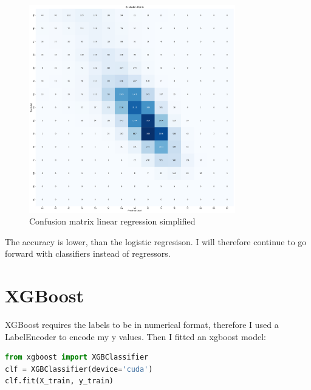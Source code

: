 \documentclass{article}
\begin{document}
\begin{figure}[H]
    \centering    
    \includegraphics[width=0.8\textwidth]{../Models/LinearRegression/confusion_matrix2.pdf}
    \caption{Confusion matrix linear regression simplified}\label{fig:conf_linreg2}
\end{figure}


The accuracy is lower, than the logistic regresison. I will therefore continue to go forward with classifiers instead of regressors.

\section{XGBoost}

XGBoost requires the labels to be in numerical format, therefore I used a LabelEncoder to encode my y values.
Then I fitted an xgboost model:

\begin{lstlisting}[language=python, caption={XGBoost model definition}]
from xgboost import XGBClassifier
clf = XGBClassifier(device='cuda')
clf.fit(X_train, y_train)
\end{lstlisting}
\end{document}
